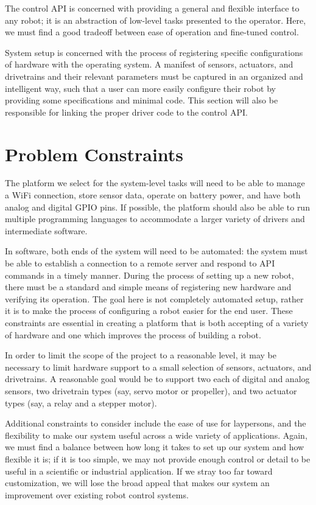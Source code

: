 \documentclass{article}
\begin{document}
The control API is concerned with providing a general and flexible interface to any robot;  it is an abstraction of low-level tasks presented to the operator.  Here, we must find a good tradeoff between ease of operation and fine-tuned control.

System setup is concerned with the process of registering specific configurations of hardware with the operating system.  A manifest of sensors, actuators, and drivetrains and their relevant parameters must be captured in an organized and intelligent way, such that a user can more easily configure their robot by providing some specifications and minimal code.  This section will also be responsible for linking the proper driver code to the control API.

\section{Problem Constraints}
The platform we select for the system-level tasks will need to be able to manage a WiFi connection, store sensor data, operate on battery power, and have both analog and digital GPIO pins.  If possible, the platform should also be able to run multiple programming languages to accommodate a larger variety of drivers and intermediate software.

In software, both ends of the system will need to be automated: the system must be able to establish a connection to a remote server and respond to API commands in a timely manner.  During the process of setting up a new robot, there must be a standard and simple means of registering new hardware and verifying its operation.  The goal here is not completely automated setup, rather it is to make the process of configuring a robot easier for the end user.  These constraints are essential in creating a platform that is both accepting of a variety of hardware and one which improves the process of building a robot.

In order to limit the scope of the project to a reasonable level, it may be necessary to limit hardware support to a small selection of sensors, actuators, and drivetrains.  A reasonable goal would be to support two each of digital and analog sensors, two drivetrain types (say, servo motor or propeller), and two actuator types (say, a relay and a stepper motor).

Additional constraints to consider include the ease of use for laypersons, and the flexibility to make our system useful across a wide variety of applications.  Again, we must find a balance between how long it takes to set up our system and how flexible it is; if it is too simple, we may not provide enough control or detail to be useful in a scientific or industrial application.  If we stray too far toward customization, we will lose the broad appeal that makes our system an improvement over existing robot control systems.
\end{document}
